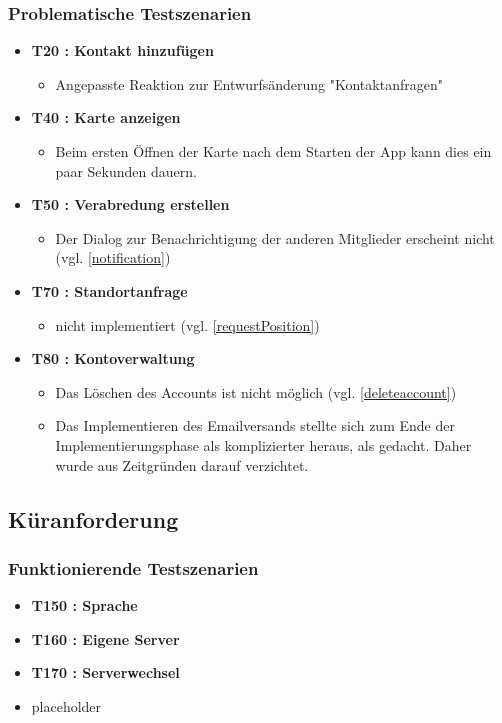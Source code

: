 \documentclass[parskip=full,11pt]{scrartcl}
\begin{document}
		\subsubsection{Problematische Testszenarien}
			\begin{itemize}
				\item \textbf{T20 : Kontakt hinzufügen}
					\begin{itemize}
						\item Angepasste Reaktion zur Entwurfsänderung "Kontaktanfragen"
					\end{itemize}
				\item \textbf{T40 : Karte anzeigen}
					\begin{itemize}
						\item Beim ersten Öffnen der Karte nach dem Starten der App kann
									dies ein paar Sekunden dauern.
						\end{itemize}
				\item \textbf{T50 : Verabredung erstellen}
					\begin{itemize}
						\item Der Dialog zur Benachrichtigung der anderen
                  Mitglieder erscheint nicht (vgl. \ref{notification})
					\end{itemize}
				\item \textbf{T70 : Standortanfrage}
					\begin{itemize}
						\item nicht implementiert (vgl. \ref{requestPosition})
					\end{itemize}
				\item \textbf{T80 : Kontoverwaltung}
					\begin{itemize}
            \item Das Löschen des Accounts ist nicht möglich
									(vgl. \ref{deleteaccount})
          	\item Das Implementieren des Emailversands stellte sich
                  zum Ende der Implementierungsphase als
                  komplizierter heraus, als gedacht. Daher wurde aus
                  Zeitgründen darauf verzichtet.
					\end{itemize}
				\end{itemize}

	\subsection{Küranforderung}
		\subsubsection{Funktionierende Testszenarien}
			\begin{itemize}
				\item \textbf{T150 : Sprache}
				\item \textbf{T160 : Eigene Server}
				\item \textbf{T170 : Serverwechsel}
                \item placeholder
	        \end{itemize}
\end{document}
